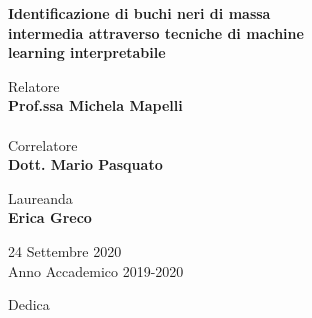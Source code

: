 \documentclass[corpo=12pt,numerazioneromana]{toptesi}
\begin{document}
\begin{titlepage}
\vspace{18mm}
\begin{center}
\vspace{5mm}
{\LARGE{\bf Identificazione di buchi neri di massa}}\\
\vspace{3mm}
{\LARGE{\bf intermedia attraverso tecniche di machine }}\\
\vspace{3mm}
{\LARGE{\bf learning interpretabile }}\\
\end{center}
\vspace{30mm}
\par
\noindent
\begin{minipage}[t]{0.47\textwidth}
{\large Relatore\\ \bf Prof.ssa Michela Mapelli}\\
\\
{\large Correlatore\\ \bf Dott. Mario Pasquato}

\end{minipage}
\hfill
\begin{minipage}[t]{0.47\textwidth} \raggedleft
{\large Laureanda\\ \bf Erica Greco}
\end{minipage}
\vspace{30mm}
\begin{center}
\large 24 Settembre 2020\smallskip\\
Anno Accademico 2019-2020
\end{center}
\end{titlepage}
\restoregeometry







\frontmatter

\begin{flushright}
\noindent
Dedica
\end{flushright}
\cleardoublepage
\end{document}
